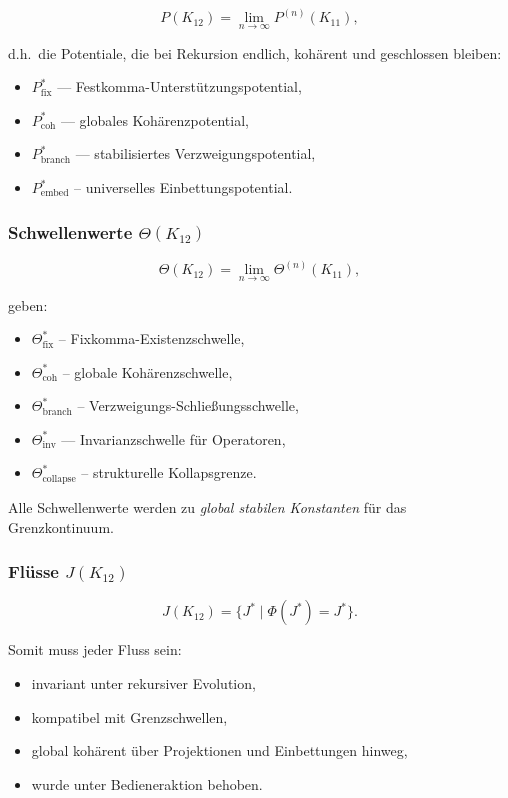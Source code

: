 \[
P(K_{12}) = \lim_{n\to\infty} P^{(n)}(K_{11}),
\]

d.h.\ die Potentiale, die bei Rekursion endlich, kohärent und geschlossen bleiben:
\begin{itemize}
    \item $P_{\mathrm{fix}}^*$ — Festkomma-Unterstützungspotential,
    \item $P_{\mathrm{coh}}^*$ — globales Kohärenzpotential,
    \item $P_{\mathrm{branch}}^*$ — stabilisiertes Verzweigungspotential,
    \item $P_{\mathrm{embed}}^*$ – universelles Einbettungspotential.
\end{itemize}

\subsubsection{Schwellenwerte $\Theta(K_{12})$}

\[
\Theta(K_{12}) =
\lim_{n\to\infty} \Theta^{(n)}(K_{11}),
\]

geben:
\begin{itemize}
    \item $\Theta^*_{\mathrm{fix}}$ – Fixkomma-Existenzschwelle,
    \item $\Theta^*_{\mathrm{coh}}$ – globale Kohärenzschwelle,
    \item $\Theta^*_{\mathrm{branch}}$ – Verzweigungs-Schließungsschwelle,
    \item $\Theta^*_{\mathrm{inv}}$ — Invarianzschwelle für Operatoren,
    \item $\Theta^*_{\mathrm{collapse}}$ – strukturelle Kollapsgrenze.
\end{itemize}

Alle Schwellenwerte werden zu \emph{global stabilen Konstanten} für das Grenzkontinuum.

\subsubsection{Flüsse $J(K_{12})$}

\[
J(K_{12}) = \{J^*\mid \Phi(J^*)=J^*\}.
\]

Somit muss jeder Fluss sein:
\begin{itemize}
    \item invariant unter rekursiver Evolution,
    \item kompatibel mit Grenzschwellen,
    \item global kohärent über Projektionen und Einbettungen hinweg,
    \item wurde unter Bedieneraktion behoben.
\end{itemize}

